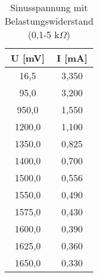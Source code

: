 \begin{table}[h]
	\begin{center}
		\begin{tabular}{cc}
			U [mV]&I [mA] \\ \hline
			16,5&3,350\\
			95,0&3,200\\
			950,0&1,550\\
			1200,0&1,100\\
			1350,0&0,825\\
			1400,0&0,700\\
			1500,0&0,556\\
			1550,0&0,490\\
			1575,0&0,430\\
			1600,0&0,390\\
			1625,0&0,360\\
			1650,0&0,330
		\end{tabular}
		\caption{Sinusspannung mit Belastungswiderstand (0,1-5 k$\Omega$)}
		\label{tabds}
	\end{center}
\end{table}